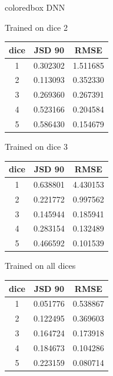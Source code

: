 \documentclass[xcolor=dvipsnames]{beamer}
\begin{document}
{  %
  \begin{beamercolorbox}[wd=\textwidth,sep=1ex]{coloredbox}
    \centering
    DNN
  \end{beamercolorbox}
  \begin{minipage}{.3\linewidth}
    \centering
    Trained on dice 2\\[0.1cm]
    \begin{tabular}{ccc}
      dice & JSD 90 & RMSE\\
      \hline
      1 & 0.302302 & 1.511685 \\
      2 & 0.113093 & 0.352330 \\
      3 & 0.269360 & 0.267391 \\
      4 & 0.523166 & 0.204584 \\
      5 & 0.586430 & 0.154679
    \end{tabular}
  \end{minipage}\hfill%
  \begin{minipage}{.3\linewidth}
    \centering
    Trained on dice 3\\[0.1cm]
    \begin{tabular}{ccc}
      dice & JSD 90 & RMSE\\
      \hline
      1 & 0.638801 & 4.430153 \\
      2 & 0.221772 & 0.997562 \\
      3 & 0.145944 & 0.185941 \\
      4 & 0.283154 & 0.132489 \\
      5 & 0.466592 & 0.101539
    \end{tabular}
  \end{minipage}\hfill
  \begin{minipage}{.3\linewidth}
    \centering
    Trained on all dices\\[0.1cm]
    \begin{tabular}{ccc}
      dice & JSD 90 & RMSE\\
      \hline
      1 & 0.051776 & 0.538867\\
      2 & 0.122495 & 0.369603\\
      3 & 0.164724 & 0.173918\\
      4 & 0.184673 & 0.104286\\
      5 & 0.223159 & 0.080714
    \end{tabular}
  \end{minipage}\\[0.3cm]

}
\end{document}
